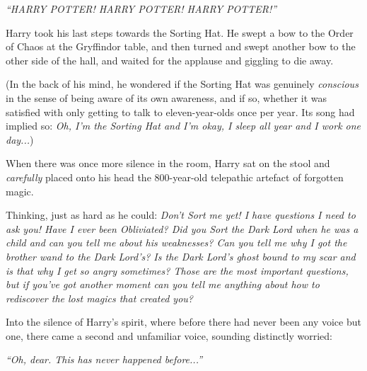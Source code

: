 \emph{``HARRY POTTER! HARRY POTTER! HARRY POTTER!''}

Harry took his last steps towards the Sorting Hat. He swept a bow to the Order of Chaos at the Gryffindor table, and then turned and swept another bow to the other side of the hall, and waited for the applause and giggling to die away.

(In the back of his mind, he wondered if the Sorting Hat was genuinely \emph{conscious} in the sense of being aware of its own awareness, and if so, whether it was satisfied with only getting to talk to eleven-year-olds once per year. Its song had implied so: \emph{Oh, I'm the Sorting Hat and I'm okay, I sleep all year and I work one day...})

When there was once more silence in the room, Harry sat on the stool and \emph{carefully} placed onto his head the 800-year-old telepathic artefact of forgotten magic.

Thinking, just as hard as he could: \emph{Don't Sort me yet! I have questions I need to ask you! Have I ever been Obliviated? Did you Sort the Dark Lord when he was a child and can you tell me about his weaknesses? Can you tell me why I got the brother wand to the Dark Lord's? Is the Dark Lord's ghost bound to my scar and is that why I get so angry sometimes? Those are the most important questions, but if you've got another moment can you tell me anything about how to rediscover the lost magics that created you?}

Into the silence of Harry's spirit, where before there had never been any voice but one, there came a second and unfamiliar voice, sounding distinctly worried:

\emph{``Oh, dear. This has never happened before...''}
